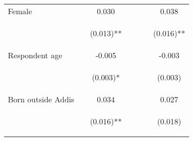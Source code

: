\begin{tabular}{lcccccc}
\noalign{\smallskip}Female &  & 0.030 &  &  &  & 0.038\\
 & \begin{footnotesize}\end{footnotesize} & \begin{footnotesize}(0.013)**\end{footnotesize} & \begin{footnotesize}\end{footnotesize} & \begin{footnotesize}\end{footnotesize} & \begin{footnotesize}\end{footnotesize} & \begin{footnotesize}(0.016)**\end{footnotesize}\\
\noalign{\smallskip}Respondent age &  & -0.005 &  &  &  & -0.003\\
 & \begin{footnotesize}\end{footnotesize} & \begin{footnotesize}(0.003)*\end{footnotesize} & \begin{footnotesize}\end{footnotesize} & \begin{footnotesize}\end{footnotesize} & \begin{footnotesize}\end{footnotesize} & \begin{footnotesize}(0.003)\end{footnotesize}\\
\noalign{\smallskip}Born outside Addis &  & 0.034 &  &  &  & 0.027\\
 & \begin{footnotesize}\end{footnotesize} & \begin{footnotesize}(0.016)**\end{footnotesize} & \begin{footnotesize}\end{footnotesize} & \begin{footnotesize}\end{footnotesize} & \begin{footnotesize}\end{footnotesize} & \begin{footnotesize}(0.018)\end{footnotesize}\\

\end{tabular}
